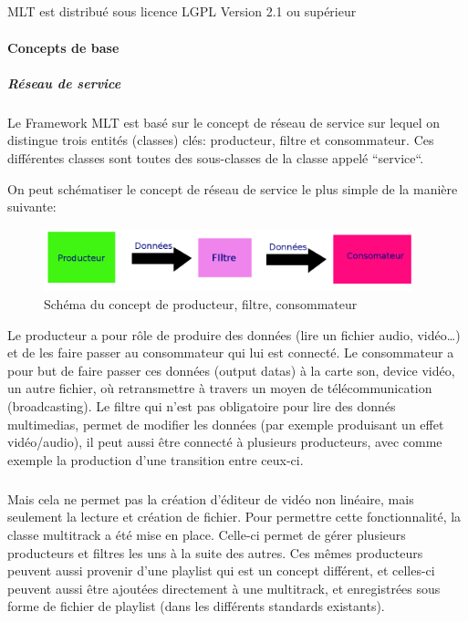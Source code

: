 \subparagraph{}

MLT est distribué sous licence LGPL Version 2.1 ou supérieur

\paragraph{Concepts de base}

\subparagraph{Réseau de service}

\subparagraph{}

Le Framework MLT est basé sur le concept de réseau de service
sur lequel on distingue trois entités (classes) clés: producteur, filtre
et consommateur. Ces différentes classes sont toutes des sous-classes
de la classe appelé ``service``.

On peut schématiser le concept de réseau de service le plus simple de
la manière suivante:

\begin{figure} [H]

  \begin{center}

    \includegraphics[width=0.95\textwidth]{images/producerConsumer}

  \end{center}

  \caption{Schéma du concept de producteur, filtre, consommateur}

  \label{Yes}

\end{figure}

Le producteur a pour rôle de produire des données (lire un fichier
audio, vidéo\ldots) et de les faire passer au consommateur qui lui
est connecté. Le consommateur a pour but de faire passer ces données
(output datas) à la carte son, device vidéo, un autre fichier, où
retransmettre à travers un moyen de télécommunication (broadcasting).
Le filtre qui n'est pas obligatoire pour lire des donnés multimedias,
permet de modifier les données (par exemple produisant un effet
vidéo/audio), il peut aussi être connecté à plusieurs producteurs,
avec comme exemple la production d'une transition entre ceux-ci.

\subparagraph{}

Mais cela ne permet pas la création d'éditeur de vidéo non linéaire,
mais seulement la lecture et création de fichier. Pour permettre cette
fonctionnalité, la classe multitrack a été mise en place. Celle-ci
permet de gérer plusieurs producteurs et filtres les uns à la suite des
autres. Ces mêmes producteurs peuvent aussi provenir d'une playlist qui
est un concept différent, et celles-ci peuvent aussi être ajoutées
directement à une multitrack, et enregistrées sous forme de fichier
de playlist (dans les différents standards existants).

